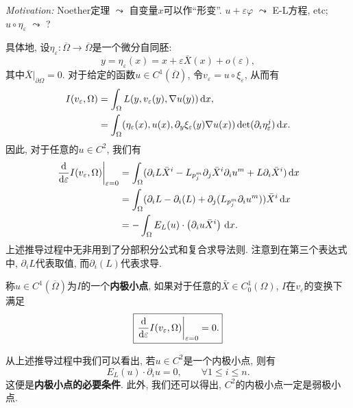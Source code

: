 \emph{Motivation:} Noether定理 $\leadsto$ 自变量$x$可以作``形变''. 
$u + \varepsilon\varphi$ $\leadsto$ E-L方程, etc; $u \circ \eta_{\varepsilon}$ $\leadsto$ ? 

具体地, 设$\eta_{\varepsilon}\colon \overline{\Omega} \rightarrow \overline{\Omega}$是一个微分自同胚:
\begin{equation*}
    y = \eta_{\varepsilon}(x) = x + \varepsilon\bar{X}(x) + o(\varepsilon),
\end{equation*}
其中$\bar{X}|_{\partial\Omega} = 0$. 对于给定的函数$u \in C^1(\overline{\Omega})$, 令$v_{\varepsilon} = u \circ \xi_{\varepsilon}$, 从而有 
\begin{align*}
    I(v_{\varepsilon}, \Omega) &= \int_{\Omega}L(y, v_{\varepsilon}(y), \nabla u(y)) \,{\rm d}x,\\  
    &= \int_{\Omega}(\eta_{\varepsilon}(x), u(x), \partial_y\xi_{\varepsilon}(y)\nabla u(x))\det(\partial_i\eta_{\varepsilon}^j) \,{\rm d}x. 
\end{align*}
因此, 对于任意的$u \in C^2$, 我们有
\begin{align*}
    \left.\frac{{\rm d}}{{\rm d}\varepsilon}I(v_{\varepsilon}, \Omega)\right|_{\varepsilon = 0} &= \int_{\Omega}(\partial_iL\bar{X}^i  -L_{p_j^m}\partial_j\bar{X}^i\partial_iu^m + L\partial_i\bar{X}^i) \,{\rm d}x \\
    &= \int_{\Omega}(\partial_iL -\partial_i(L) +\partial_j(L_{p_j^m}\partial_iu^m))\bar{X}^i \,{\rm d}x \\  
    &= -\int_{\Omega}E_L(u) \cdot \left(\partial_iu\bar{X}^i\right) \,{\rm d}x. 
\end{align*} 
上述推导过程中无非用到了分部积分公式和复合求导法则. 注意到在第三个表达式中, $\partial_iL$代表取值, 而$\partial_i(L)$代表求导.

\begin{definition}
    称$u \in C^1(\overline{\Omega})$为$I$的一个\textbf{内极小点}, 如果对于任意的$\bar{X} \in C_0^1(\Omega)$, $I$在$v_{\varepsilon}$的变换下满足
    \begin{equation*}
        \boxed{\left.\frac{{\rm d}}{{\rm d}\varepsilon}I(v_{\varepsilon}, \Omega)\right|_{\varepsilon = 0}  = 0.}
    \end{equation*} 
\end{definition}

从上述推导过程中我们可以看出, 若$u \in C^2$是一个内极小点, 则有 
\begin{equation*}
    \boxed{E_L(u) \cdot \partial_iu = 0, \qquad \forall 1 \leq i \leq n.}
\end{equation*}
这便是\textbf{内极小点的必要条件}. 此外, 我们还可以得出, $C^2$的内极小点一定是弱极小点.


